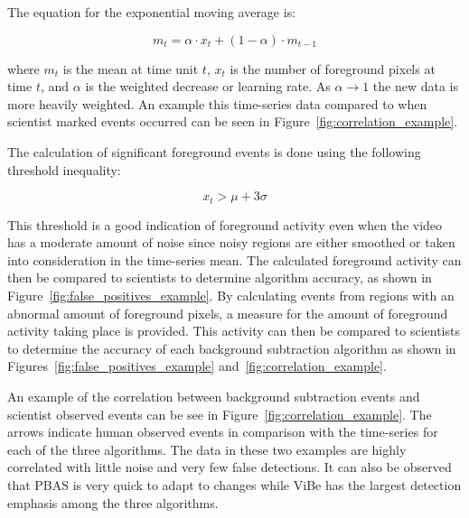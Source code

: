 The equation for the exponential moving average is:

\begin{equation}
    m_t = \alpha \cdot x_t + (1-\alpha) \cdot m_{t-1}
    \label{eq:exponential_moving_average}
\end{equation}

where $m_t$ is the mean at time unit $t$, $x_t$ is the number of foreground pixels at time $t$, and $\alpha$ is the weighted decrease or learning rate. As $\alpha \to 1$ the new data is more heavily weighted. An example this time-series data compared to when scientist marked events occurred can be seen in Figure~\ref{fig:correlation_example}.

The calculation of significant foreground events is done using the following threshold inequality:

\begin{equation}
    x_t > \mu + 3\sigma
    \label{eq:outliers}
\end{equation}

This threshold is a good indication of foreground activity even when the video has a moderate amount of noise since noisy regions are either smoothed or taken into consideration in the time-series mean. The calculated foreground activity can then be compared to scientists to determine algorithm accuracy, as shown in Figure~\ref{fig:false_positives_example}. By calculating events from regions with an abnormal amount of foreground pixels, a measure for the amount of foreground activity taking place is provided. This activity can then be compared to scientists to determine the accuracy of each background subtraction algorithm as shown in Figures~\ref{fig:false_positives_example} and~\ref{fig:correlation_example}.

An example of the correlation between background subtraction events and scientist observed events can be see in Figure~\ref{fig:correlation_example}. The arrows indicate human observed events in comparison with the time-series for each of the three algorithms. The data in these two examples are highly correlated with little noise and very few false detections. It can also be observed that PBAS is very quick to adapt to changes while ViBe has the largest detection emphasis among the three algorithms.

\begin{sidewaysfigure}[!t]
\centering
{}
\hfil
{}
\caption{Example of event and foreground pixel count correlation. Red arrows indicate a scientist observed event and lines indicate foreground pixel count for each algorithm.}
\label{fig:correlation_example}
\end{sidewaysfigure}

